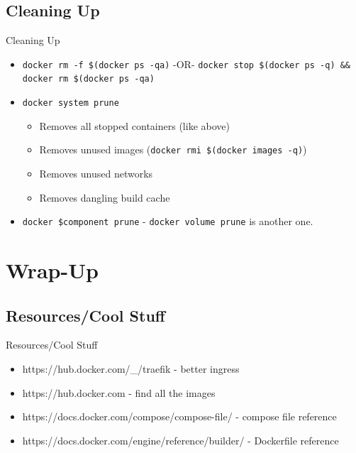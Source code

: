 \documentclass{beamer}
\begin{document}
\subsection{Cleaning Up}
\begin{frame}{Cleaning Up}
    \begin{itemize}
        \item \texttt{docker rm -f \$(docker ps -qa)} -OR- \texttt{docker stop \$(docker ps -q) \&\& docker rm \$(docker ps -qa)}
        \item \texttt{docker system prune}
        \begin{itemize}
            \item Removes all stopped containers (like above)
            \item Removes unused images (\texttt{docker rmi \$(docker images -q)})
            \item Removes unused networks
            \item Removes dangling build cache
        \end{itemize}
        \item \texttt{docker \$component prune} - \texttt{docker volume prune} is another one.
    \end{itemize}
\end{frame}

\section{Wrap-Up}
\subsection{Resources/Cool Stuff}
\begin{frame}{Resources/Cool Stuff}
    \begin{itemize}
        \item https://hub.docker.com/\_/traefik - better ingress
        \item https://hub.docker.com - find all the images
        \item https://docs.docker.com/compose/compose-file/ - compose file reference
        \item https://docs.docker.com/engine/reference/builder/ - Dockerfile reference
    \end{itemize}
\end{frame}
\end{document}
